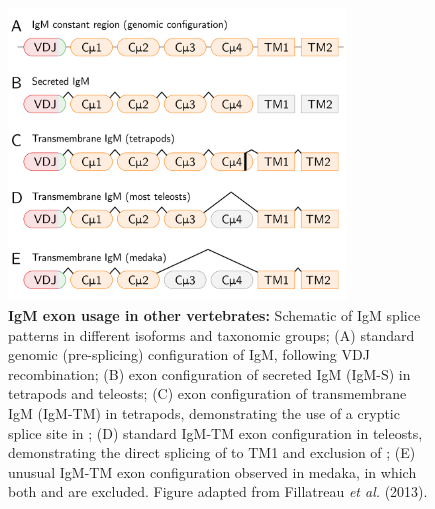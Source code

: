 	\begin{figure}
	\centering
		    \begin{subfigure}{0em}
        \label{fig:teleost-igm-exons-a}
    \end{subfigure}
    \begin{subfigure}{0em}
        \label{fig:teleost-igm-exons-b}
    \end{subfigure}
    \begin{subfigure}{0em}
        \label{fig:teleost-igm-exons-c}
    \end{subfigure}
    \begin{subfigure}{0em}
        \label{fig:teleost-igm-exons-d}
    \end{subfigure}
    \begin{subfigure}{0em}
        \label{fig:teleost-igm-exons-e}
    \end{subfigure}
	\includegraphics[width=0.8\textwidth]{_Figures/png_edited/teleost-igm-exons}
	\caption[IgM exon usage in other vertebrates]{\textbf{IgM exon usage in other vertebrates:} Schematic of IgM splice patterns in different isoforms and taxonomic groups; (A) standard genomic (pre-splicing) configuration of IgM, following VDJ recombination; (B) exon configuration of secreted IgM (IgM-S) in tetrapods and teleosts; (C) exon configuration of transmembrane IgM (IgM-TM) in tetrapods, demonstrating the use of a cryptic splice site in ; (D) standard IgM-TM exon configuration in teleosts, demonstrating the direct splicing of  to TM1 and exclusion of ; (E) unusual IgM-TM exon configuration observed in medaka, in which both  and  are excluded. Figure adapted from Fillatreau \textit{et al.} (2013).}
	\label{fig:teleost-igm-exons}
	\end{figure}
	
